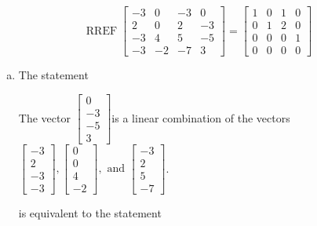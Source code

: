 \begin{exerciseAnswer} 
\[\operatorname{RREF}  \left[\begin{array}{ccc|c}
-3 & 0 & -3 & 0 \\
2 & 0 & 2 & -3 \\
-3 & 4 & 5 & -5 \\
-3 & -2 & -7 & 3
\end{array}\right] = \left[\begin{array}{ccc|c}
1 & 0 & 1 & 0 \\
0 & 1 & 2 & 0 \\
0 & 0 & 0 & 1 \\
0 & 0 & 0 & 0
\end{array}\right] \]
\begin{enumerate}[(a)]
\item  The statement 
\begin{center}\begin{minipage}{0.8\textwidth}
 The vector \( \left[\begin{array}{c}
0 \\
-3 \\
-5 \\
3
\end{array}\right] \)is a linear combination of the vectors \( \left[\begin{array}{c}
-3 \\
2 \\
-3 \\
-3
\end{array}\right] , \left[\begin{array}{c}
0 \\
0 \\
4 \\
-2
\end{array}\right] , \text{ and } \left[\begin{array}{c}
-3 \\
2 \\
5 \\
-7
\end{array}\right] \). 
\end{minipage}\end{center}
     is equivalent to the statement 
\begin{center}\begin{minipage}{0.8\textwidth}
 The vector equation \( x_{1} \left[\begin{array}{c}
-3 \\
2 \\
-3 \\
-3

\end{array}
\end{minipage}
\end{center}
\end{enumerate}
\end{exerciseAnswer}
